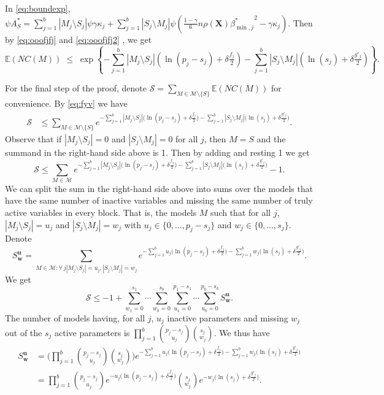 \documentclass[bj,authoryear]{imsart}
\theoremstyle{plain}
\newcommand{\E}{\mathbb{E}}
\newcommand{\M}{\mathcal{M}}
\newcommand{\bs}{\boldsymbol}
\begin{document}
In \eqref{eq:boundexp}, $\psi A^*_S=\sum_{j=1}^b|M_j \setminus S_j|\psi\gamma\kappa_j + \sum_{j=1}^b |S_j\setminus M_j |\psi\left(\tfrac{1-\gamma}{6} n \rho(\bs X) {\beta^*_{\min,j}}^{2} - \gamma\kappa_j\right)$. Then by \eqref{eq:ooofjfj} and \eqref{eq:ooofjfj2} , we get
\begin{equation}\label{eq:fyv}
\E(NC(M))\;\leq\;\exp\left\{- \sum_{j=1}^b |M_j\setminus S_j|(\ln(p_j-s_j)+\delta \tfrac{f_j}{2})-\sum_{j=1}^b |S_j\setminus M_j|(\ln(s_j)+\delta \tfrac{g'_j}{2})\right\}.    
\end{equation}

For the final step of the proof, denote $\mathcal{S}= \sum_{M \in \M\setminus \{S\}} \E\left(NC(M)\right)$ for convenience. By \eqref{eq:fyv} we have
\begin{align*}
    \mathcal{S} &\leq \sum_{M \in \M\setminus \{S\}}e^{- \sum_{j=1}^b |M_j\setminus S_j|\big(\ln(p_j-s_j)+\delta \tfrac{f_j}{2}\big)-\sum_{j=1}^b |S_j\setminus M_j|\big(\ln(s_j)+\delta \tfrac{g'_j}{2}\big)}.
\end{align*}
Observe that if $|M_j\setminus S_j|=0$ and $|S_j\setminus M_j|=0$ for all $j$, then $M=S$ and the summand in the right-hand side above is 1. Then by adding and resting 1 we get
$$\mathcal{S} \leq \sum_{M \in \M}e^{- \sum_{j=1}^b |M_j\setminus S_j|\big(\ln(p_j-s_j)+\delta \tfrac{f_j}{2}\big)-\sum_{j=1}^b |S_j\setminus M_j|\big(\ln(s_j)+\delta \tfrac{g'_j}{2}\big)}-1.$$
We can split the sum in the right-hand side above into sums over the models that have the same number of inactive variables and missing the same number of truly active variables in every block. That is, the models $M$ such that for all $j$, $|M_j\setminus S_j|=u_j$ and $|S_j\setminus M_j|=w_j$ with $u_j \in \{0,\ldots,p_j-s_j\}$ and $w_j \in \{0,\ldots,s_j\}$. Denote
$$S^{\bs u}_{\bs w}=\sum_{M \in \M:\forall \,j |M_j\setminus S_j|=u_j, |S_j\setminus M_j|=w_j } e^{- \sum_{j=1}^b u_j\big(\ln(p_j-s_j)+\delta \tfrac{f_j}{2}\big)-\sum_{j=1}^b w_j\big(\ln(s_j)+\delta \tfrac{g'_j}{2}\big)}.$$
We get
\begin{equation}\label{eq:uygfew}
    \mathcal{S} \leq -1+\sum_{w_1=0}^{s_1}\cdots\sum_{w_b=0}^{s_b}\sum_{u_1=0}^{p_1-s_1}\cdots\sum_{u_b=0}^{p_b-s_b}S^{\bs u}_{\bs w}.
\end{equation}
The number of models having, for all $j$, $u_j$ inactive parameters and missing $w_j$ out of the $s_j$ active parameters %
is $\prod_{j=1}^b {\binom{p_j-s_j}{u_j}}{\binom{s_j}{w_j}}$. We thus have
\begin{align*}
    S^{\bs u}_{\bs w}&= \bigg(\prod_{j=1}^b {\binom{p_j-s_j}{u_j}}{\binom{s_j}{w_j}}\bigg)e^{- \sum_{j=1}^b u_j\big(\ln(p_j-s_j)+\delta \tfrac{f_j}{2}\big)-\sum_{j=1}^b w_j\big(\ln(s_j)+\delta \tfrac{g'_j}{2}\big)} \\
    &= \prod_{j=1}^b {\binom{p_j-s_j}{u_j}}e^{- u_j\big(\ln(p_j-s_j)+\delta \tfrac{f_j}{2}\big)}{\binom{s_j}{w_j}}e^{-w_j\big(\ln(s_j)+\delta \tfrac{g'_j}{2}\big)}.
\end{align*}
\end{document}

